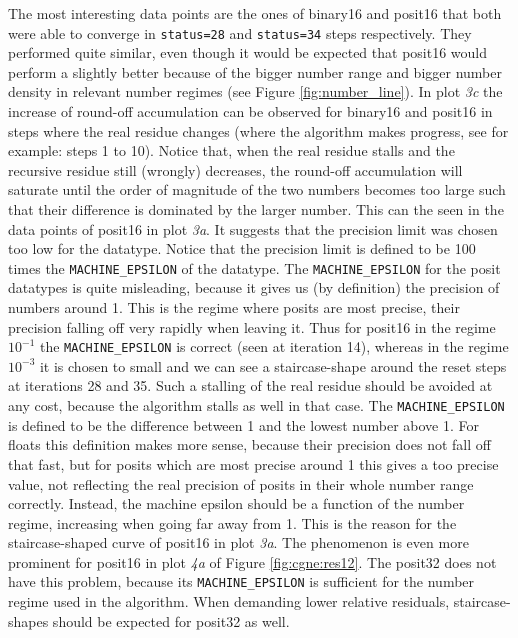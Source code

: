 \documentclass{article}
\theoremstyle{plain} %
\theoremstyle{convention} %
\theoremstyle{remark} %
\def\code#1{\texttt{#1}}
\numberwithin{equation}{section}
\begin{document}
The most interesting data points are the ones of \gls{binary16} and \gls{posit16} that both were able to converge in \code{status=28} and \code{status=34} steps respectively. They performed quite similar, even though it would be expected that \gls{posit16} would perform a slightly better because of the bigger number range and bigger number density in relevant number regimes (see Figure \ref{fig:number_line}). In plot \textit{3c} the increase of round-off accumulation can be observed for \gls{binary16} and \gls{posit16} in steps where the real residue changes (where the algorithm makes progress, see for example: steps \num{1} to \num{10}). Notice that, when the real residue stalls and the recursive residue still (wrongly) decreases, the round-off accumulation will saturate until the order of magnitude of the two numbers becomes too large such that their difference is dominated by the larger number. This can the seen in the data points of \gls{posit16} in plot \textit{3a}. It suggests that the precision limit was chosen too low for the datatype. Notice that the precision limit is defined to be \num{100} times the \code{MACHINE\_EPSILON} of the datatype. The \code{MACHINE\_EPSILON} for the posit datatypes is quite misleading, because it gives us (by definition) the precision of numbers around \num{1}. This is the regime where posits are most precise, their precision falling off very rapidly when leaving it. Thus for \gls{posit16} in the regime $10^{-1}$ the \code{MACHINE\_EPSILON} is correct (seen at iteration \num{14}), whereas in the regime $10^{-3}$ it is chosen to small and we can see a staircase-shape around the reset steps at iterations \num{28} and \num{35}. Such a stalling of the real residue should be avoided at any cost, because the algorithm stalls as well in that case. The \code{MACHINE\_EPSILON} is defined to be the difference between \num{1} and the lowest number above \num{1}. For floats this definition makes more sense, because their precision does not fall off that fast, but for posits which are most precise around \num{1} this gives a too precise value, not reflecting the real precision of posits in their whole number range correctly. Instead, the machine epsilon should be a function of the number regime, increasing when going far away from \num{1}. This is the reason for the staircase-shaped curve of \gls{posit16} in plot \textit{3a}. The phenomenon is even more prominent for \gls{posit16} in plot \textit{4a} of Figure \ref{fig:cgne:res12}. The \gls{posit32} does not have this problem, because its \code{MACHINE\_EPSILON} is sufficient for the number regime used in the algorithm. When demanding lower relative residuals, staircase-shapes should be expected for \gls{posit32} as well.
\end{document}
